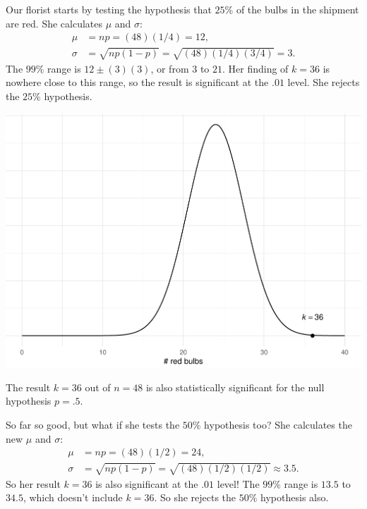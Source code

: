 \documentclass[justified]{tufte-book}
\theoremstyle{definition}
\theoremstyle{definition}
\theoremstyle{definition}
\theoremstyle{remark}
\begin{document}
Our florist starts by testing the hypothesis that \(25\%\) of the bulbs
in the shipment are red. She calculates \(\mu\) and \(\sigma\): \[
  \begin{aligned}
    \mu &= np = (48)(1/4) = 12,\\
    \sigma &= \sqrt{np(1-p)} = \sqrt{(48)(1/4)(3/4)} = 3.
  \end{aligned}
\] The \(99\%\) range is \(12 \pm (3)(3)\), or from \(3\) to \(21\). Her
finding of \(k = 36\) is nowhere close to this range, so the result is
significant at the \(.01\) level. She rejects the \(25\%\) hypothesis.

\begin{marginfigure}
\includegraphics{_main_files/figure-latex/unnamed-chunk-152-1} \caption[The result $k = 36$ out of $n = 48$ is also statistically significant for the null hypothesis $p = .5$]{The result $k = 36$ out of $n = 48$ is also statistically significant for the null hypothesis $p = .5$.}\label{fig:unnamed-chunk-152}
\end{marginfigure}

So far so good, but what if she tests the \(50\%\) hypothesis too? She
calculates the new \(\mu\) and \(\sigma\): \[
  \begin{aligned}
    \mu &= np = (48)(1/2) = 24,\\
    \sigma &= \sqrt{np(1-p)} = \sqrt{(48)(1/2)(1/2)} \approx 3.5.
  \end{aligned}
\] So her result \(k = 36\) is also significant at the \(.01\) level!
The \(99\%\) range is \(13.5\) to \(34.5\), which doesn't include
\(k = 36\). So she rejects the \(50\%\) hypothesis also.
\end{document}
